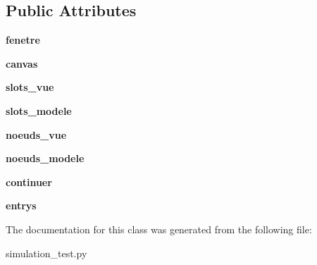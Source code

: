 \subsection*{Public Attributes}
\begin{DoxyCompactItemize}
\item 
{\bfseries fenetre}\hypertarget{classsimulation__test_1_1Controleur_a16e756813d81cb32cb48405b97ba8fa5}{}\label{classsimulation__test_1_1Controleur_a16e756813d81cb32cb48405b97ba8fa5}

\item 
{\bfseries canvas}\hypertarget{classsimulation__test_1_1Controleur_ae7ad95ebbad92e66d592dc77c4db68d2}{}\label{classsimulation__test_1_1Controleur_ae7ad95ebbad92e66d592dc77c4db68d2}

\item 
{\bfseries slots\+\_\+vue}\hypertarget{classsimulation__test_1_1Controleur_a198d27388620133c86fad9f0b9774b62}{}\label{classsimulation__test_1_1Controleur_a198d27388620133c86fad9f0b9774b62}

\item 
{\bfseries slots\+\_\+modele}\hypertarget{classsimulation__test_1_1Controleur_a65772fdac4403bc491b66dac808f038c}{}\label{classsimulation__test_1_1Controleur_a65772fdac4403bc491b66dac808f038c}

\item 
{\bfseries noeuds\+\_\+vue}\hypertarget{classsimulation__test_1_1Controleur_a3b7c812a8764752a06b2bc89c8c98db9}{}\label{classsimulation__test_1_1Controleur_a3b7c812a8764752a06b2bc89c8c98db9}

\item 
{\bfseries noeuds\+\_\+modele}\hypertarget{classsimulation__test_1_1Controleur_a457f6760bdb97205ce7ea6f0248bd43a}{}\label{classsimulation__test_1_1Controleur_a457f6760bdb97205ce7ea6f0248bd43a}

\item 
{\bfseries continuer}\hypertarget{classsimulation__test_1_1Controleur_a655bd174f865989a2ee5dab9980527d0}{}\label{classsimulation__test_1_1Controleur_a655bd174f865989a2ee5dab9980527d0}

\item 
{\bfseries entrys}\hypertarget{classsimulation__test_1_1Controleur_aff7fc03f9b678197f0214424811bf0a4}{}\label{classsimulation__test_1_1Controleur_aff7fc03f9b678197f0214424811bf0a4}

\end{DoxyCompactItemize}


The documentation for this class was generated from the following file\+:\begin{DoxyCompactItemize}
\item 
simulation\+\_\+test.\+py\end{DoxyCompactItemize}
